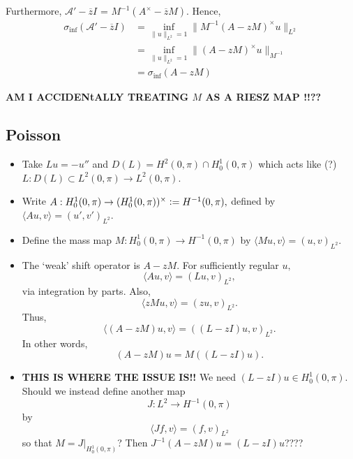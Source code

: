 \documentclass[12pt,a4paper]{article}
\newcommand{\defeq}{\vcentcolon=}
\theoremstyle{boldthm}
\theoremstyle{bolddefn}
\begin{document}
Furthermore, 
$\mathcal{A}' - \overline{z} I $ = $M^{-1}(A^{\times} - \overline{z}M).$ Hence,
\begin{align}
    \sigma_{\inf}(\mathcal{A}' - \overline{z}I) &= \inf_{\|u\|_{L^2} = 1} \| M^{-1} (A - zM)^{\times} u \|_{L^2} \\
    & = \inf_{\|u\|_{L^2} = 1} \| (A - zM)^{\times} u \|_{M^{-1}}\\
    &= \sigma_{\inf}(A-zM)
 \end{align}

\textbf{ AM I ACCIDENtALLY TREATING $M$ AS A RIESZ MAP !!??}

\subsection{Poisson}

\begin{itemize}
    \item Take $Lu = -u''$ and $D(L) = H^2(0, \pi) \cap H_0^1(0, \pi)$ which acts like (?) $L : D(L) \subset L^2(0, \pi) \rightarrow L^2(0, \pi).$
    \item Write $A : H_0^1(0, \pi) \rightarrow (H_0^1(0, \pi))^{\times} \defeq H^{-1}(0,\pi),$ defined by $\langle Au, v \rangle = (u', v')_{L^2}.$
    \item Define the mass map $M : H_0^1(0, \pi) \rightarrow H^{-1}(0, \pi)$ by $\langle Mu, v\rangle = (u, v)_{L^2}.$

    \item The `weak' shift operator is $A-zM$. For sufficiently regular $u,$ 
\begin{equation}
    \langle Au, v \rangle = (Lu, v)_{L^2},
\end{equation}
via integration by parts. Also, 
\begin{equation}
    \langle z Mu, v \rangle = (zu, v)_{L^2}.
\end{equation}
Thus, 
\begin{equation}
    \langle (A-zM)u, v\rangle = ((L-zI)u, v)_{L^2}.
\end{equation}
In other words,
\begin{equation}
    (A-zM)u = M((L-zI)u).
\end{equation}

\item \textbf{THIS IS WHERE THE ISSUE IS!!} We need $(L-zI)u \in H_0^1(0, \pi).$ Should we instead define another map 
$$J : L^2 \rightarrow H^{-1}(0, \pi)$$ by 
$$\langle Jf, v \rangle = (f, v)_{L^2}$$
so that $M = J |_{H_0^1(0, \pi)}$? Then $J^{-1}(A-zM)u = (L-zI)u$????


\end{itemize}
\end{document}
